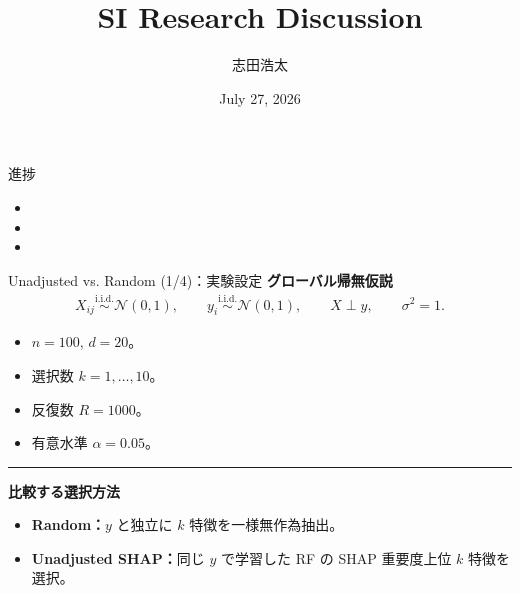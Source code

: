 \documentclass[aspectratio=169,11pt]{beamer}
\title{\textbf{SI Research Discussion}}
\author{志田浩太}
\date{July 27, 2026}
\begin{document}
\begin{frame}
  \titlepage
\end{frame}

\begin{frame}{進捗}
  \begin{itemize}
    \item {}
    \vspace{0.55cm}
    \item {}
    \vspace{0.55cm}
    \item {}
  \end{itemize}
\end{frame}

\begin{frame}{Unadjusted vs. Random (1/4)：実験設定}
  \textbf{グローバル帰無仮説}
  \[
    \begin{gathered}
      X_{ij}\overset{\mathrm{i.i.d.}}{\sim}\mathcal N(0,1),\qquad
      y_i\overset{\mathrm{i.i.d.}}{\sim}\mathcal N(0,1),\qquad
      X\perp y,\qquad \sigma^2=1.
    \end{gathered}
  \]

  \vspace{0.15cm}
  \begin{itemize}
    \item $n=100$, $d=20$。
    \item 選択数 $k=1,\ldots,10$。
    \item 反復数 $R=1000$。
    \item 有意水準 $\alpha=0.05$。
  \end{itemize}

  \vspace{0.18cm}
  \noindent\rule{\linewidth}{0.6pt}
  \vspace{0.14cm}
  \textbf{比較する選択方法}
  \begin{itemize}
    \item \textbf{Random：}$y$ と独立に $k$ 特徴を一様無作為抽出。
    \item \textbf{Unadjusted SHAP：}同じ $y$ で学習した RF の SHAP 重要度上位 $k$ 特徴を選択。
  \end{itemize}
\end{frame}
\end{document}

